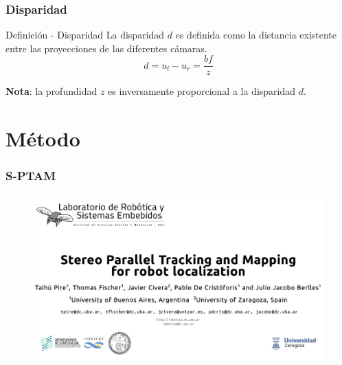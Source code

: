 \documentclass[compress]{beamer}
\begin{document}
\begin{frame}
\frametitle{Disparidad}


\begin{block}{Definición - Disparidad}
La disparidad $d$ es definida como la distancia existente entre las proyecciones de las diferentes cámaras.
\begin{equation}
d=u_{l}-u_{r}=\frac{bf}{z}
\end{equation}
\end{block}

\textbf{Nota}: la profundidad $z$ es inversamente proporcional a la disparidad $d$.

\end{frame}


\section{Método}


\begin{frame}
\frametitle{S-PTAM}
\begin{figure}[htb]
	\centering
	\includegraphics[width=1.0\columnwidth]{method/portada-sptam-kitti-video.pdf}
	\hfill
\end{figure}

\end{frame}
\end{document}
